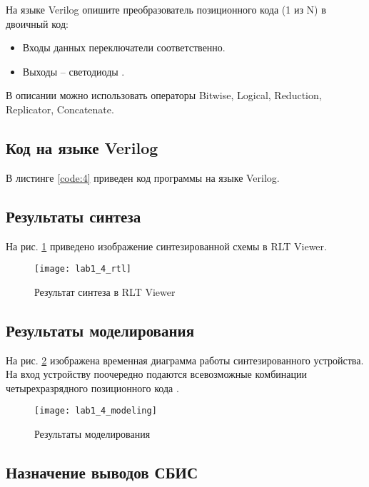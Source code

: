 На языке Verilog опишите преобразователь позиционного кода (1 из N) в двоичный код:
\begin{itemize}
	\item Входы данных переключатели  соответственно.
	\item Выходы – светодиоды .
\end{itemize}
В описании можно использовать операторы Bitwise, Logical, Reduction, Replicator, Concatenate.

\subsection{Код на языке Verilog}

В листинге \ref{code:4} приведен код программы на языке Verilog.



\subsection{Результаты синтеза}

На рис. \ref{fig:lab1_4_rtl} приведено изображение синтезированной схемы в RLT Viewer.

\begin{figure}[H]
\begin{center}
	\texttt{[image: lab1\_4\_rtl]}
	\caption{Результат синтеза в RLT Viewer}
	\label{fig:lab1_4_rtl}
\end{center}
\end{figure}

\subsection{Результаты моделирования}
\label{sec:lab1_4_modeling}

На рис. \ref{fig:lab1_4_modeling} изображена временная диаграмма работы синтезированного устройства. На вход устройству поочередно подаются всевозможные комбинации четырехразрядного позиционного кода .
\begin{figure}[H]
\begin{center}
	\texttt{[image: lab1\_4\_modeling]}
	\caption{Результаты моделирования}
	\label{fig:lab1_4_modeling}
\end{center}
\end{figure}

\subsection{Назначение выводов СБИС}

